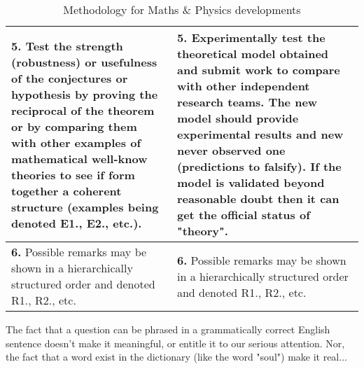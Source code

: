 \begin{table}[H]
\begin{tabular}{|p{7.5cm}|p{7.5cm}|}
			\textbf{5.} Test the strength (robustness) or usefulness of the conjectures or hypothesis by proving the reciprocal of the theorem or by comparing them with other examples of mathematical well-know theories to see if form together a coherent structure (examples being denoted E1., E2., etc.). & \textbf{5.} Experimentally test the theoretical model obtained and submit work to compare with other independent research teams. The new model should provide experimental results and new never observed one (predictions to falsify). If the model is validated beyond reasonable doubt then it can get the official status of "theory".\\ \hline
			\textbf{6.} Possible remarks may be shown in a hierarchically structured order and denoted R1., R2., etc. & \textbf{6.} Possible remarks may be shown in a hierarchically structured order and denoted R1., R2., etc.			
			\\ \hline
		\end{tabular}
		\caption{Methodology for Maths \& Physics developments}
	\end{table}	
	
	
	\begin{tcolorbox}[title=Remark,arc=10pt,breakable,drop lifted shadow,
  skin=enhanced,
  skin first is subskin of={enhancedfirst}{arc=10pt,no shadow},
  skin middle is subskin of={enhancedmiddle}{arc=10pt,no shadow},
  skin last is subskin of={enhancedlast}{drop lifted shadow}]
	The fact that a question can be phrased in a grammatically correct English sentence doesn't make it meaningful, or entitle it to our serious attention. Nor, the fact that a word exist in the dictionary (like the word "soul") make it real...
	\end{tcolorbox}
	
